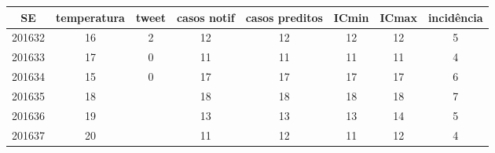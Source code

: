 \begin{tabular}{c|ccccccc}
  \hline
SE & temperatura & tweet & casos notif & casos preditos & ICmin & ICmax & incidência \\ 
  \hline
201632 & 16 & 2 & 12 & 12 & 12 & 12 & 5 \\ 
  201633 & 17 & 0 & 11 & 11 & 11 & 11 & 4 \\ 
  201634 & 15 & 0 & 17 & 17 & 17 & 17 & 6 \\ 
  201635 & 18 &  & 18 & 18 & 18 & 18 & 7 \\ 
  201636 & 19 &  & 13 & 13 & 13 & 14 & 5 \\ 
  201637 & 20 &  & 11 & 12 & 11 & 12 & 4 \\ 
   \hline
\end{tabular}
